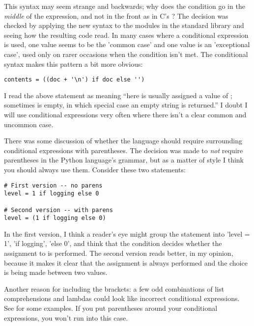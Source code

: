 \documentclass{howto}
\begin{document}
This syntax may seem strange and backwards; why does the condition go
in the \emph{middle} of the expression, and not in the front as in C's
?  The decision was checked by applying the new syntax
to the modules in the standard library and seeing how the resulting
code read.  In many cases where a conditional expression is used, one
value seems to be the 'common case' and one value is an 'exceptional
case', used only on rarer occasions when the condition isn't met.  The
conditional syntax makes this pattern a bit more obvious:

\begin{verbatim}
contents = ((doc + '\n') if doc else '')
\end{verbatim}

I read the above statement as meaning ``here  is 
usually assigned a value of ; sometimes 
 is empty, in which special case an empty string is returned.''  
I doubt I will use conditional expressions very often where there 
isn't a clear common and uncommon case.

There was some discussion of whether the language should require
surrounding conditional expressions with parentheses.  The decision
was made to \emph{not} require parentheses in the Python language's
grammar, but as a matter of style I think you should always use them.
Consider these two statements:

\begin{verbatim}
# First version -- no parens
level = 1 if logging else 0

# Second version -- with parens
level = (1 if logging else 0)
\end{verbatim}

In the first version, I think a reader's eye might group the statement
into 'level = 1', 'if logging', 'else 0', and think that the condition
decides whether the assignment to  is performed.  The
second version reads better, in my opinion, because it makes it clear
that the assignment is always performed and the choice is being made
between two values.

Another reason for including the brackets: a few odd combinations of
list comprehensions and lambdas could look like incorrect conditional
expressions. See  for some examples.  If you put parentheses
around your conditional expressions, you won't run into this case.


\begin{seealso}


\end{seealso}
\end{document}
